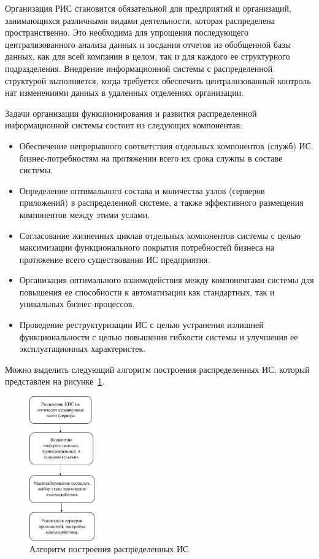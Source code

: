 \documentclass[report, draught]{fefudoc}
\begin{document}
Организация РИС становится обязательной для предприятий и организаций, занимающихся различными видами деятельности, которая распределена пространственно. Это необходима для упрощения последующего централизованного анализа данных и зосдания отчетов из обобщенной базы данных, как для всей компании в целом, так и для каждого ее структурного подразделения. Внедрение информационной системы с распределенной структурой выполняется, когда требуется обеспечить централизованный контроль нат изменениями данных в удаленных отделениях организации.

Задачи организации функционирования и развития распределенной информационной системы состоит из следующих компонентав:
\begin{itemize}
\item Обеспечение непрерывного соответствия отдельных компонентов (служб) ИС бизнес-потребностям на протяжении всего их срока служпы в составе системы.
\item Определение оптимального состава и количества узлов (серверов приложений) в распределенной системе, а также эффективного размещения компонентов между этими услами.
\item Согласование жизненных циклав отдельных компонентов системы с целью максимизации функционального покрытия потребностей бизнеса на протяжение всего существования ИС предприятия.
\item Организация оптимального взаимодействия между компонентами системы для повышения ее способности к автоматизации как стандартных, так и уникальных бизнес-процессов.
\item Проведение реструктуризации ИС с целью устранения излишней функциональности с целью повышения гибкости системы и улучшения ее эксплуатационных характеристек.
\end{itemize}

Можно выделить следующий алгоритм построения распределенных ИС, который представлен на рисунке~\ref{fig_algo}.

\begin{figure}
\centering
\includegraphics[width=0.25\textwidth]{1}
\caption{Алгоритм построения распределенных ИС}
\label{fig_algo}
\end{figure}
\end{document}
